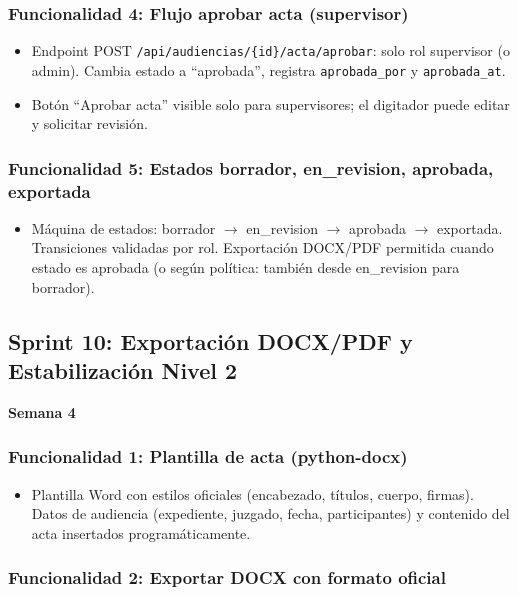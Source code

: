 \documentclass[12pt,a4paper]{report}
\begin{document}
\subsubsection{Funcionalidad 4: Flujo aprobar acta (supervisor)}

\begin{itemize}
    \item Endpoint POST \texttt{/api/audiencias/\{id\}/acta/aprobar}: solo rol supervisor (o admin). Cambia estado a ``aprobada'', registra \texttt{aprobada\_por} y \texttt{aprobada\_at}.
    \item Botón ``Aprobar acta'' visible solo para supervisores; el digitador puede editar y solicitar revisión.
\end{itemize}

\subsubsection{Funcionalidad 5: Estados borrador, en\_revision, aprobada, exportada}

\begin{itemize}
    \item Máquina de estados: borrador $\to$ en\_revision $\to$ aprobada $\to$ exportada. Transiciones validadas por rol. Exportación DOCX/PDF permitida cuando estado es aprobada (o según política: también desde en\_revision para borrador).
\end{itemize}

\subsection{Sprint 10: Exportación DOCX/PDF y Estabilización Nivel 2}

\textbf{Semana 4}

\subsubsection{Funcionalidad 1: Plantilla de acta (python-docx)}

\begin{itemize}
    \item Plantilla Word con estilos oficiales (encabezado, títulos, cuerpo, firmas). Datos de audiencia (expediente, juzgado, fecha, participantes) y contenido del acta insertados programáticamente.
\end{itemize}

\subsubsection{Funcionalidad 2: Exportar DOCX con formato oficial}
\end{document}
